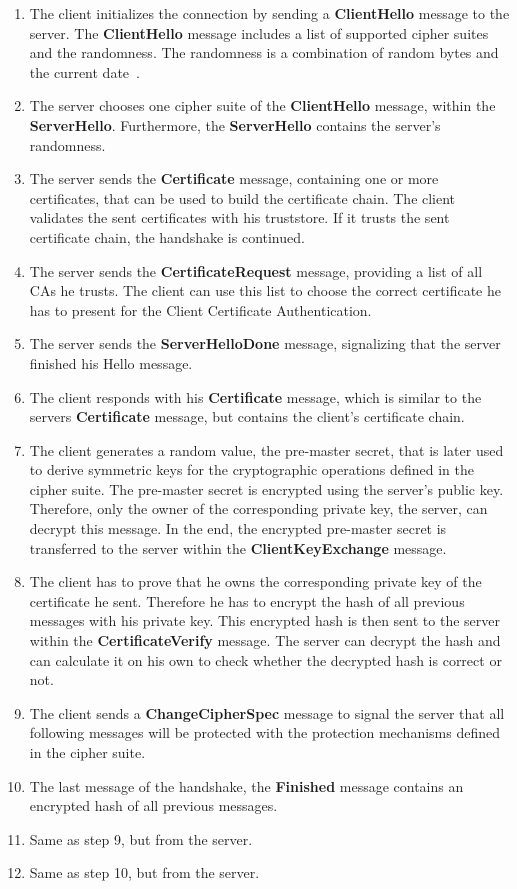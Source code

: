 \begin{enumerate}
	\item The client initializes the connection by sending a \textbf{ClientHello} message to the server.
		The \textbf{ClientHello} message includes a list of supported cipher suites and the randomness.
		The randomness is a combination of random bytes and the current date~\cite{mediumtls}.
	\item The server chooses one cipher suite of the \textbf{ClientHello} message, within the \textbf{ServerHello}.
		Furthermore, the \textbf{ServerHello} contains the server's randomness.
	\item The server sends the \textbf{Certificate} message, containing one or more certificates, that can be used to build the certificate chain.
		The client validates the sent certificates with his truststore.
		If it trusts the sent certificate chain, the handshake is continued.
	\item The server sends the \textbf{CertificateRequest} message, providing a list of all CAs he trusts.
		The client can use this list to choose the correct certificate he has to present for the Client Certificate Authentication.
	\item The server sends the \textbf{ServerHelloDone} message, signalizing that the server finished his Hello message.
	\item The client responds with his \textbf{Certificate} message, which is similar to the servers \textbf{Certificate} message, but contains the client's certificate chain.
	\item The client generates a random value, the pre-master secret, that is later used to derive symmetric keys for the cryptographic operations defined in the cipher suite.
		The pre-master secret is encrypted using the server's public key.
		Therefore, only the owner of the corresponding private key, the server, can decrypt this message.
		In the end, the encrypted pre-master secret is transferred to the server within the \textbf{ClientKeyExchange} message.
	\item The client has to prove that he owns the corresponding private key of the certificate he sent.
		Therefore he has to encrypt the hash of all previous messages with his private key.
		This encrypted hash is then sent to the server within the \textbf{CertificateVerify} message.
		The server can decrypt the hash and can calculate it on his own to check whether the decrypted hash is correct or not.
	\item The client sends a \textbf{ChangeCipherSpec} message to signal the server that all following messages will be protected with the protection mechanisms defined in the cipher suite.
	\item The last message of the handshake, the \textbf{Finished} message contains an encrypted hash of all previous messages.
	\item Same as step 9, but from the server.
	\item Same as step 10, but from the server.
\end{enumerate}
